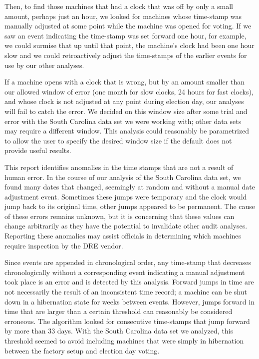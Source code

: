 Then, to find those machines that had a 
clock that was off by only a small amount, perhaps just an
hour, we looked for
machines whose time-stamp was manually adjusted at some point while
the machine was opened for voting. If we saw an event indicating the
time-stamp was set forward one hour, for example, we could surmise that
up until that point, the machine's clock had been one hour slow and we
could retroactively adjust the time-stamps of the earlier events for
use by our other analyses.

If a machine opens with a clock that is wrong, but by an amount
smaller than our allowed window of error (one month for slow clocks,
24 hours for fast clocks), and whose clock is not adjusted at any
point during election day, our analyses will fail to catch the
error. We decided on this window size after some trial and error with
the South Carolina data set we were working with; other data sets may
require a different 
window. This analysis could reasonably be parametrized to
allow the user to specify the desired window size if the default does
not provide useful results.

This report identifies anomalies in the time stamps that are not a result
of human error. In the course of our analysis of the South Carolina
data set, we found many dates that changed, seemingly at random and without
a manual date adjustment event. Sometimes these jumps were temporary
and the clock would jump back to its original time, other jumps
appeared to be permanent. The cause of these errors remains
unknown, but it is concerning that these values can change arbitrarily
as they have the potential to invalidate other audit analyses.  Reporting these
anomalies may assist officials in determining which machines require
inspection by the DRE vendor.

Since events are appended in chronological order, any time-stamp that decreases
chronologically without a corresponding event indicating a manual
adjustment took place is an error and is detected by this
analysis. Forward jumps in time are not necessarily the result of an 
inconsistent time record; a machine can be shut down in a hibernation state for
weeks between events. However, jumps
forward in time that are larger than a certain threshold can reasonably be considered
erroneous. The algorithm looked for consecutive time-stamps that jump
forward by more than 33 days. With the South Carolina data set we
analyzed, this threshold seemed to
avoid including machines that were simply in hibernation between the
factory setup and election day voting. 

